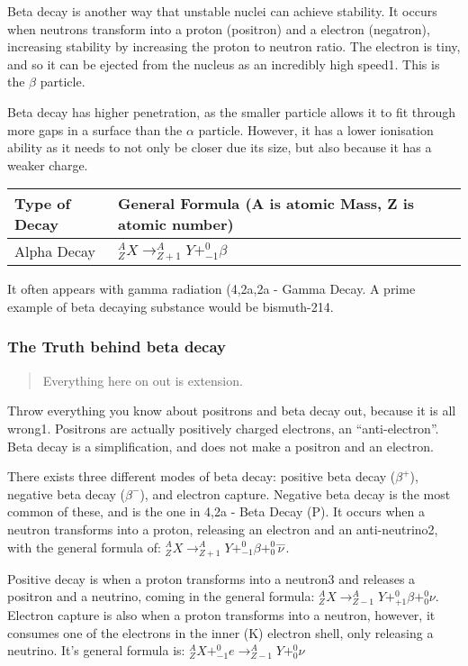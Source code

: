 \documentclass[
]{article}
\begin{document}
Beta decay is another way that unstable nuclei can achieve stability. It
occurs when neutrons transform into a proton (positron) and a electron
(negatron), increasing stability by increasing the proton to neutron
ratio. The electron is tiny, and so it can be ejected from the nucleus
as an incredibly high speed1. This is the {\(\beta\)} particle.

Beta decay has higher penetration, as the smaller particle allows it to
fit through more gaps in a surface than the {\(\alpha\)} particle.
However, it has a lower ionisation ability as it needs to not only be
closer due its size, but also because it has a weaker charge.

\begin{longtable}[]{@{}ll@{}}
\toprule()
Type of Decay & General Formula (A is atomic Mass, Z is atomic
number) \\
\midrule()
\endhead
Alpha Decay &
{\(_{Z}^{A}X \rightarrow_{Z + 1}^{A}Y +_{- 1}^{0}\beta\)} \\
\bottomrule()
\end{longtable}

It often appears with gamma radiation (4,2a,2a - Gamma Decay. A prime
example of beta decaying substance would be bismuth-214.

\hypertarget{the-truth-behind-beta-decay}{%
\subsubsection{The Truth behind beta
decay}\label{the-truth-behind-beta-decay}}

\begin{quote}
Everything here on out is extension.
\end{quote}

Throw everything you know about positrons and beta decay out, because it
is all wrong1. Positrons are actually positively charged electrons, an
``anti-electron''. Beta decay is a simplification, and does not make a
positron and an electron.

There exists three different modes of beta decay: positive beta decay
({\(\beta^{+}\)}), negative beta decay ({\(\beta^{-}\)}), and electron
capture. Negative beta decay is the most common of these, and is the one
in 4,2a - Beta Decay (P). It occurs when a neutron transforms into a
proton, releasing an electron and an anti-neutrino2, with the general
formula of:
{\(_{Z}^{A}X \rightarrow_{Z + 1}^{A}Y +_{- 1}^{0}\beta +_{0}^{0}\overset{―}{\nu}\)}.

Positive decay is when a proton transforms into a neutron3 and releases
a positron and a neutrino, coming in the general formula:
{\(_{Z}^{A}X \rightarrow_{Z - 1}^{A}Y +_{+ 1}^{0}\beta +_{0}^{0}\nu\)}.
Electron capture is also when a proton transforms into a neutron,
however, it consumes one of the electrons in the inner (K) electron
shell, only releasing a neutrino. It's general formula is:
{\(_{Z}^{A}X +_{- 1}^{0}e \rightarrow_{Z - 1}^{A}Y +_{0}^{0}\nu\)}
\end{document}
